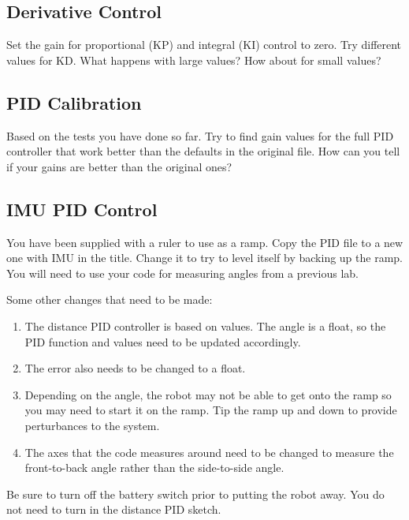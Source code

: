 \subsection{Derivative Control}
Set the gain for proportional (KP) and integral (KI) control to zero.
Try different values for KD. What happens with large values? How about 
for small values?

\subsection{PID Calibration}
Based on the tests you have done so far. Try to find gain values for the 
full PID controller that work better than the defaults in the original file.
How can you tell if your gains are better than the original ones?

\subsection{IMU PID Control}
You have been supplied with a ruler to use as a ramp. Copy the PID file to 
a new one with IMU in the title. Change it to try to level itself by 
backing up the ramp. You will need to use your code for measuring angles 
from a previous lab.

Some other changes that need to be made:
\begin{enumerate}
    \item The distance PID controller is based on \lstinline@int@ values.
            The angle is a float, so the PID function and values need to be 
            updated accordingly.
    \item The error also needs to be changed to a float.
    \item Depending on the angle, the robot may not be able to get onto the
            ramp so you may need to start it on the ramp. Tip the ramp up
            and down to provide perturbances to the system.
    \item The axes that the code measures around need to be changed to 
            measure the front-to-back angle rather than the side-to-side 
            angle.
\end{enumerate}

Be sure to turn off the battery switch prior to putting the robot away. You do not need to turn in 
the distance PID sketch.

